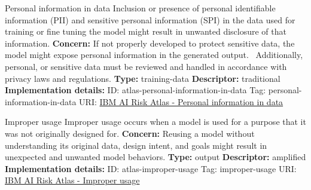 \documentclass[a4paper,12pt]{article}
\begin{document}
\begin{definitionbox}{Personal information in data}
Inclusion or presence of personal identifiable information (PII) and sensitive personal information (SPI) in the data used for training or fine tuning the model might result in unwanted disclosure of that information.\newline\newline
\textbf{Concern: }If not properly developed to protect sensitive data, the model might expose personal information in the generated output.  Additionally, personal, or sensitive data must be reviewed and handled in accordance with privacy laws and regulations.\newline\newline
\textbf{Type: }training-data\newline
\textbf{Descriptor: }traditional \newline\newline
\textbf{Implementation details: } \newline
ID: atlas-personal-information-in-data \newline
Tag: personal-information-in-data \newline
URI:  \href{https://www.ibm.com/docs/en/watsonx/saas?topic=SSYOK8/wsj/ai-risk-atlas/personal-information-in-data.html}{IBM AI Risk Atlas - Personal information in data}\newline
\end{definitionbox}
\begin{definitionbox}{Improper usage}
Improper usage occurs when a model is used for a purpose that it was not originally designed for.\newline\newline
\textbf{Concern: }Reusing a model without understanding its original data, design intent, and goals might result in unexpected and unwanted model behaviors.\newline\newline
\textbf{Type: }output\newline
\textbf{Descriptor: }amplified \newline\newline
\textbf{Implementation details: } \newline
ID: atlas-improper-usage \newline
Tag: improper-usage \newline
URI:  \href{https://www.ibm.com/docs/en/watsonx/saas?topic=SSYOK8/wsj/ai-risk-atlas/improper-usage.html}{IBM AI Risk Atlas - Improper usage}\newline
\end{definitionbox}
\end{document}
